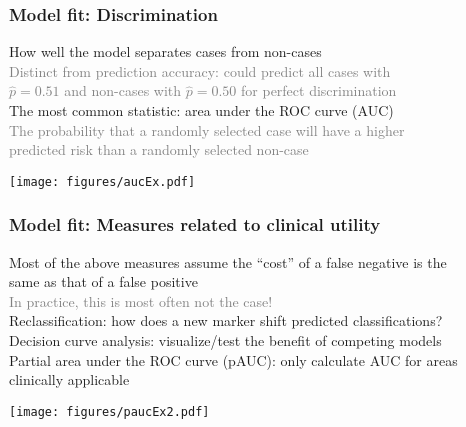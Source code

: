\documentclass{beamer}
\newcommand{\si}[1]{\hspace{.5cm} \textcolor{gray} {#1}\\}
\newcommand{\sicont}[1]{\hspace{1cm} \textcolor{gray} {#1}\\}
\begin{document}
{\begin{frame}[t]
\frametitle{Model fit: Discrimination}
How well the model separates cases from non-cases\\
\si{Distinct from prediction accuracy: could predict all cases with}
\sicont{$\hat p=0.51$ and non-cases with $\hat p=0.50$ for perfect discrimination}
\vspace{.2cm}
The most common statistic: area under the ROC curve (AUC)\\
\si{The probability that a randomly selected case will have a higher}
\sicont{predicted risk than a randomly selected non-case}
\begin{center}
\texttt{[image: figures/aucEx.pdf]}
\end{center}
 \end{frame}

\begin{frame}[t]
\frametitle{Model fit: Measures related to clinical utility}
Most of the above measures assume the ``cost'' of a false negative is the\\
\hspace{.5cm} same as that of a false positive\\
\si{In practice, this is most often not the case!}
\vspace{.2cm}
Reclassification: how does a new marker shift predicted classifications?\\
\vspace{.2cm}
Decision curve analysis: visualize/test the benefit of competing models\\
\vspace{.2cm}
Partial area under the ROC curve (pAUC): only calculate AUC for areas\\
\hspace{.5cm} clinically applicable\\
\begin{center}
\texttt{[image: figures/paucEx2.pdf]}
\end{center}
\end{frame}

}
\end{document}
